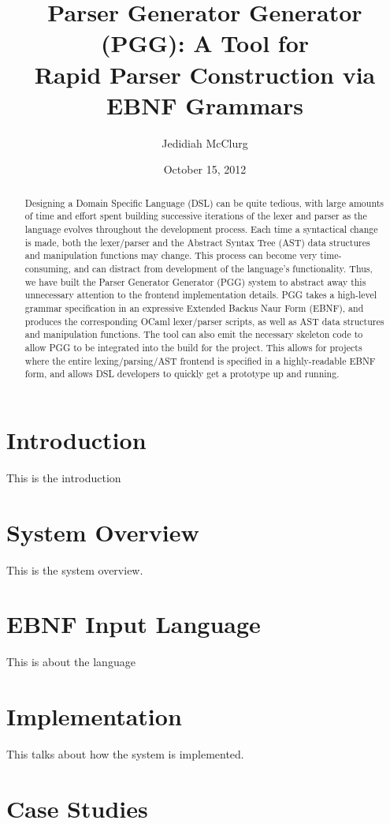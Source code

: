 \documentclass[10pt]{article}
\title{Parser Generator Generator (PGG): A Tool for \\ Rapid Parser Construction via EBNF Grammars}
\author{Jedidiah McClurg}
\date{October 15, 2012}
\begin{document}
\maketitle

\begin{abstract}
Designing a Domain Specific Language (DSL) can be quite tedious,
with large amounts of time and effort spent building successive
iterations of the lexer and parser as the language evolves
throughout the development process.
Each time a syntactical change is made, both the lexer/parser and
the Abstract Syntax Tree (AST) data structures and manipulation
functions may change.  This process can become very
time-consuming, and can distract from development of the
language's functionality.  Thus, we have built the Parser
Generator Generator (PGG) system to abstract away this unnecessary
attention to the frontend implementation details.  PGG takes a high-level
grammar specification in an expressive Extended Backus Naur Form (EBNF),
and produces the corresponding OCaml lexer/parser scripts, as
well as AST data structures and manipulation functions.  The
tool can also emit the necessary skeleton code to allow
PGG to be integrated into the build for the project.  This
allows for projects where the entire lexing/parsing/AST
frontend is specified in a highly-readable EBNF form,
and allows DSL developers to quickly get a prototype up and running.
\end{abstract}

\section{Introduction}
This is the introduction

\section{System Overview}
This is the system overview.

\section{EBNF Input Language}
This is about the language

\section{Implementation}
This talks about how the system is implemented.

\section{Case Studies}
\end{document}
